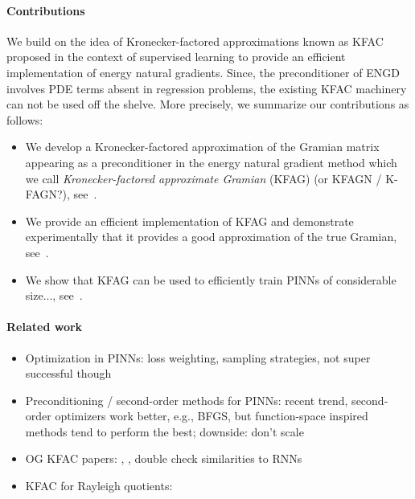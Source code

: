 \paragraph{Contributions} 
We build on the idea of Kronecker-factored approximations known as KFAC proposed in the context of supervised learning to provide an efficient implementation of energy natural gradients. 
Since, the preconditioner of ENGD involves PDE terms absent in regression problems, the existing KFAC machinery can not be used off the shelve. 
More precisely, we summarize our contributions as follows: 
\begin{itemize}
    \item We develop a Kronecker-factored approximation of the Gramian matrix appearing as a preconditioner in the energy natural gradient method which we call \emph{Kronecker-factored approximate Gramian} (KFAG) (or KFAGN / K-FAGN?), see~.
    \item We provide an efficient implementation of KFAG and demonstrate experimentally that it provides a good approximation of the true Gramian, see~. 
    \item We show that KFAG can be used to efficiently train PINNs of considerable size..., see~. 
\end{itemize}

\paragraph{Related work}
\begin{itemize}
    \item Optimization in PINNs: loss weighting, sampling strategies, not super successful though
    \item Preconditioning / second-order methods for PINNs: recent trend, second-order optimizers work better, e.g., BFGS, but function-space inspired methods tend to perform the best; downside: don't scale 
    \item OG KFAC papers: \cite{martens2015optimizing}, \cite{martens2018kroneckerfactored}, double check similarities to RNNs
    \item KFAC for Rayleigh quotients:
\end{itemize}

